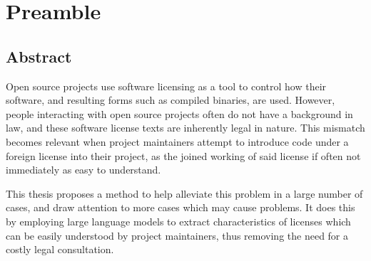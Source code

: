 
\setcounter{chapter}{-1}

\chapter{Preamble}

\section*{Abstract}

Open source projects use software licensing as a tool to control how their software, and resulting forms such as compiled binaries, are used. However, people interacting with open source projects often do not have a background in law, and these software license texts are inherently legal in nature. This mismatch becomes relevant when project maintainers attempt to introduce code under a foreign license into their project, as the joined working of said license if often not immediately as easy to understand.

This thesis proposes a method to help alleviate this problem in a large number of cases, and draw attention to more cases which may cause problems. It does this by employing large language models to extract characteristics of licenses which can be easily understood by project maintainers, thus removing the need for a costly legal consultation.